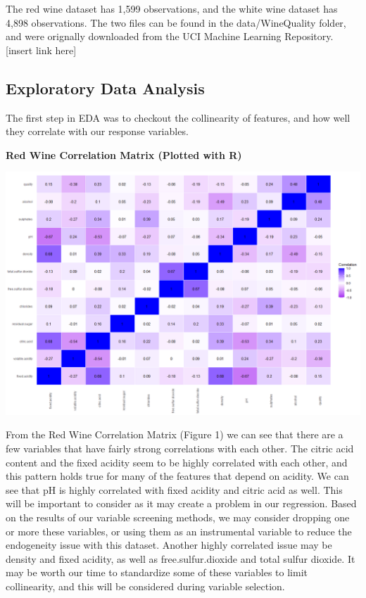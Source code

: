 \documentclass{article}
\begin{document}
	The red wine dataset has 1,599 observations, and the white wine dataset has 4,898 observations. 
	The two files can be found in the data/WineQuality folder, and were orignally downloaded from 
	the UCI Machine Learning Repository. [insert link here]

	\subsection{Exploratory Data Analysis}
	
	The first step in EDA was to checkout the collinearity of features, and how well they correlate 
	with our response variables. 
	
	
	\textbf{ Red Wine Correlation Matrix (Plotted with R)}
	
	\includegraphics[scale=0.5]{../plots/Wine/red_wine_Rcormat.png}

	From the Red Wine Correlation Matrix (Figure 1) we can see that there are a few variables that have fairly strong 
	correlations with each other. The citric acid content and the fixed acidity seem to be highly correlated 
	with each other, and this pattern holds true for many of the features that depend on acidity. We can see 
	that pH is highly correlated with fixed acidity and citric acid as well. This will be important to consider 
	as it may create a problem in our regression. Based on the results of our variable screening methods, we may
	consider dropping one or more these variables, or using them as an instrumental variable to reduce the 
	endogeneity issue with this dataset. Another highly correlated issue may be density and fixed acidity, as well 
	as free.sulfur.dioxide and total sulfur dioxide. It may be worth our time to standardize some of these 
	variables to limit collinearity, and this will be considered during variable selection. 
	
\end{document}
